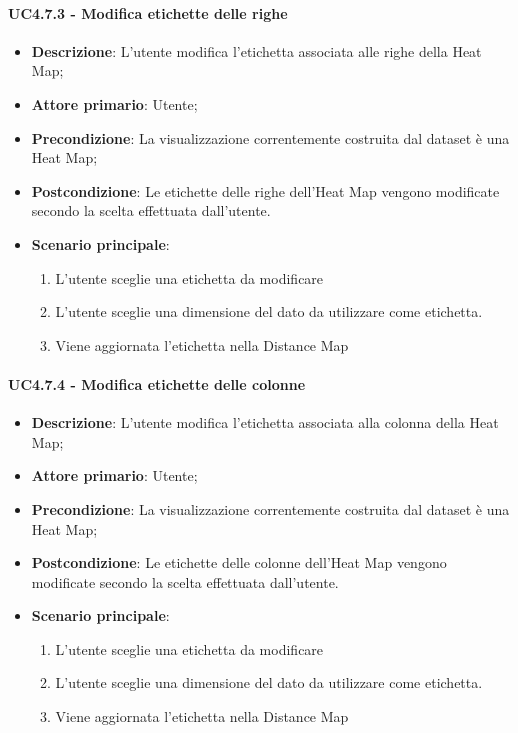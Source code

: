 \paragraph{UC4.7.3 - Modifica etichette delle righe}
\label{par:uc4.7.3}
\begin{itemize}
    \item \textbf{Descrizione}:     L'utente modifica l'etichetta associata alle righe della Heat Map;
    \item \textbf{Attore primario}: Utente;
    \item \textbf{Precondizione}:   La visualizzazione correntemente costruita dal dataset è una Heat Map;
    \item \textbf{Postcondizione}:  Le etichette delle righe dell'Heat Map vengono modificate secondo la scelta effettuata dall'utente.
    \item \textbf{Scenario principale}:
    \begin{enumerate}
        \item L'utente sceglie una etichetta da modificare
        \item L'utente sceglie una dimensione del dato da utilizzare come etichetta.
        \item Viene aggiornata l'etichetta nella Distance Map
    \end{enumerate}
\end{itemize}

\paragraph{UC4.7.4 - Modifica etichette delle colonne}
\label{par:uc4.7.4}
\begin{itemize}
    \item \textbf{Descrizione}:     L'utente modifica l'etichetta associata alla colonna della Heat Map;
    \item \textbf{Attore primario}: Utente;
    \item \textbf{Precondizione}:   La visualizzazione correntemente costruita dal dataset è una Heat Map;
    \item \textbf{Postcondizione}:  Le etichette delle colonne dell'Heat Map vengono modificate secondo la scelta effettuata dall'utente.
    \item \textbf{Scenario principale}:
    \begin{enumerate}
        \item L'utente sceglie una etichetta da modificare
        \item L'utente sceglie una dimensione del dato da utilizzare come etichetta.
        \item Viene aggiornata l'etichetta nella Distance Map
    \end{enumerate}
\end{itemize}

